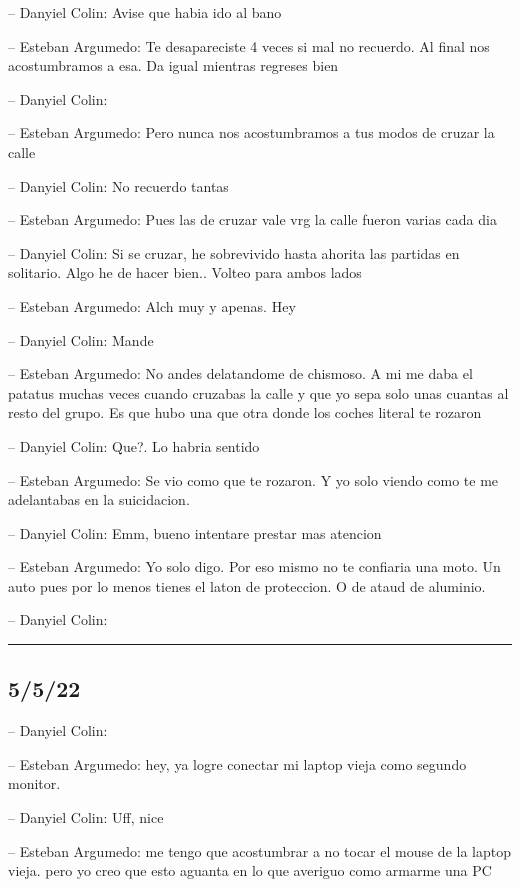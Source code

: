 -- Danyiel Colin: Avise que habia ido al bano

-- Esteban Argumedo: Te desapareciste 4 veces si mal no recuerdo. Al
final nos acostumbramos a esa. Da igual mientras regreses bien

-- Danyiel Colin:

-- Esteban Argumedo: Pero nunca nos acostumbramos a tus modos de cruzar
la calle

-- Danyiel Colin: No recuerdo tantas

-- Esteban Argumedo: Pues las de cruzar vale vrg la calle fueron varias
cada dia

-- Danyiel Colin: Si se cruzar, he sobrevivido hasta ahorita las
partidas en solitario. Algo he de hacer bien.. Volteo para ambos lados

-- Esteban Argumedo: Alch muy y apenas. Hey

-- Danyiel Colin: Mande

-- Esteban Argumedo: No andes delatandome de chismoso. A mi me daba el
patatus muchas veces cuando cruzabas la calle y que yo sepa solo unas
cuantas al resto del grupo. Es que hubo una que otra donde los coches
literal te rozaron

-- Danyiel Colin: Que?. Lo habria sentido

-- Esteban Argumedo: Se vio como que te rozaron. Y yo solo viendo como
te me adelantabas en la suicidacion.

-- Danyiel Colin: Emm, bueno intentare prestar mas atencion

-- Esteban Argumedo: Yo solo digo. Por eso mismo no te confiaria una
moto. Un auto pues por lo menos tienes el laton de proteccion. O de
ataud de aluminio.

-- Danyiel Colin:

\begin{center}\rule{0.5\linewidth}{0.5pt}\end{center}

\hypertarget{section-69}{%
\subsection{5/5/22}\label{section-69}}

-- Danyiel Colin:

-- Esteban Argumedo: hey, ya logre conectar mi laptop vieja como segundo
monitor.

-- Danyiel Colin: Uff, nice

-- Esteban Argumedo: me tengo que acostumbrar a no tocar el mouse de la
laptop vieja. pero yo creo que esto aguanta en lo que averiguo como
armarme una PC

